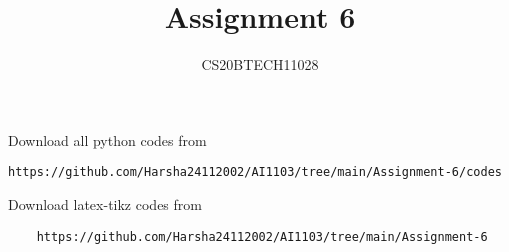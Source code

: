 \documentclass[journal,12pt,twocolumn]{IEEEtran}
\DeclareMathOperator*{\Res}{Res}
\begin{document}
\newcommand{\BEQA}{\begin{eqnarray}}
\newcommand{\EEQA}{\end{eqnarray}}
\newcommand{\define}{\stackrel{\triangle}{=}}

\raggedbottom
\setlength{\parindent}{0pt}
\providecommand{\mbf}{\mathbf}
\providecommand{\pr}[1]{\ensuremath{\Pr\left(#1\right)}}
\providecommand{\qfunc}[1]{\ensuremath{Q\left(#1\right)}}
\providecommand{\sbrak}[1]{\ensuremath{{}\left[#1\right]}}
\providecommand{\lsbrak}[1]{\ensuremath{{}\left[#1\right.}}
\providecommand{\rsbrak}[1]{\ensuremath{{}\left.#1\right]}}
\providecommand{\brak}[1]{\ensuremath{\left(#1\right)}}
\providecommand{\lbrak}[1]{\ensuremath{\left(#1\right.}}
\providecommand{\rbrak}[1]{\ensuremath{\left.#1\right)}}
\providecommand{\cbrak}[1]{\ensuremath{\left\{#1\right\}}}
\providecommand{\lcbrak}[1]{\ensuremath{\left\{#1\right.}}
\providecommand{\rcbrak}[1]{\ensuremath{\left.#1\right\}}}
\theoremstyle{remark}
\newtheorem{rem}{Remark}
\newcommand{\sgn}{\mathop{\mathrm{sgn}}}
\providecommand{\abs}[1]{\vert#1\vert}
\providecommand{\res}[1]{\Res\displaylimits_{#1}} 
\providecommand{\norm}[1]{\lVert#1\rVert}
\providecommand{\mtx}[1]{\mathbf{#1}}
\providecommand{\mean}[1]{E[ #1 ]}
\providecommand{\fourier}{\overset{\mathcal{F}}{ \rightleftharpoons}}
\providecommand{\system}{\overset{\mathcal{H}}{ \longleftrightarrow}}
\newcommand{\solution}{\noindent \textbf{Solution: }}
\newcommand{\cosec}{\,\text{cosec}\,}
\providecommand{\dec}[2]{\ensuremath{\overset{#1}{\underset{#2}{\gtrless}}}}
\newcommand{\myvec}[1]{\ensuremath{\begin{pmatrix}#1\end{pmatrix}}}
\newcommand{\mydet}[1]{\ensuremath{\begin{vmatrix}#1\end{vmatrix}}}
\makeatletter
{}
\makeatother
\let\StandardTheFigure\thefigure
\let\vec\mathbf
\renewcommand{\thefigure}{\theproblem}
\def\putbox#1#2#3{\makebox[0in][l]{\makebox[#1][l]{}\raisebox{\baselineskip}[0in][0in]{\raisebox{#2}[0in][0in]{#3}}}}
     \def\rightbox#1{\makebox[0in][r]{#1}}
     \def\centbox#1{\makebox[0in]{#1}}
     \def\topbox#1{\raisebox{-\baselineskip}[0in][0in]{#1}}
     \def\midbox#1{\raisebox{-0.5\baselineskip}[0in][0in]{#1}}
\vspace{3cm}
\title{Assignment 6}
\author{CS20BTECH11028}
\maketitle
\newpage
\bigskip
\renewcommand{\thefigure}{\theenumi}
\renewcommand{\thetable}{\theenumi}
Download all python codes from 
\begin{lstlisting}
https://github.com/Harsha24112002/AI1103/tree/main/Assignment-6/codes
\end{lstlisting}
Download latex-tikz codes from 
%
\begin{lstlisting}
    https://github.com/Harsha24112002/AI1103/tree/main/Assignment-6
\end{lstlisting}
\end{document}
